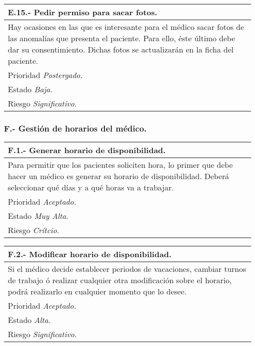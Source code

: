 \documentclass[a4paper,oneside,11pt]{book}
\begin{document}
\begin{center}
\begin{tabulary}{15cm}{|L|}
	\hline
		\bf{E.15.- Pedir permiso para sacar fotos.} \\
	\hline
		Hay ocasiones en las que es interesante para el médico sacar fotos de las anomalías que presenta el paciente. Para ello, éste último debe dar su consentimiento. Dichas fotos se actualizarán en la ficha del paciente. \\
	\hline
		Prioridad \textit{Postergado.} \\
	\hline
		Estado \textit{Baja.} \\
	\hline
		Riesgo \textit{Significativo.} \\
	\hline
\end{tabulary}
\end{center}


\subsubsection{F.- Gestión de horarios del médico.}

\begin{center}
\begin{tabulary}{15cm}{|L|}
	\hline
		\bf{F.1.- Generar horario de disponibilidad.} \\
	\hline
		Para permitir que los pacientes soliciten hora, lo primer que debe hacer un médico es generar su horario de disponibilidad. Deberá seleccionar qué días y a qué horas va a trabajar. \\
	\hline
		Prioridad \textit{Aceptado.} \\
	\hline
		Estado \textit{Muy Alta.} \\
	\hline
		Riesgo \textit{Crítcio.} \\
	\hline
\end{tabulary}
\end{center}

\begin{center}
\begin{tabulary}{15cm}{|L|}
	\hline
		\bf{F.2.- Modificar horario de disponibilidad.} \\
	\hline
		Si el médico decide establecer periodos de vacaciones, cambiar turnos de trabajo ó realizar cualquier otra modificación sobre el horario, podrá realizarlo en cualquier momento que lo desee. \\
	\hline
		Prioridad \textit{Aceptado.} \\
	\hline
		Estado \textit{Alta.} \\
	\hline
		Riesgo \textit{Significativo.} \\
	\hline
\end{tabulary}
\end{center}
\end{document}
